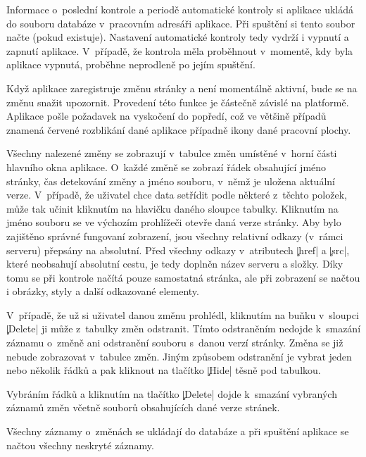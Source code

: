 Informace o~poslední kontrole a periodě automatické kontroly si aplikace ukládá do souboru databáze v~pracovním adresáři aplikace.
Při spuštění si tento soubor načte (pokud existuje).
Nastavení automatické kontroly tedy vydrží i vypnutí a zapnutí aplikace.
V~případě, že kontrola měla proběhnout v~momentě, kdy byla aplikace vypnutá, proběhne neprodleně po jejím spuštění.

Když aplikace zaregistruje změnu stránky a není momentálně aktivní, bude se na změnu snažit upozornit.
Provedení této funkce je částečně závislé na platformě. 
Aplikace pošle požadavek na vyskočení do popředí, což ve většině případů znamená červené rozblikání dané aplikace případně ikony dané pracovní plochy.

Všechny nalezené změny se zobrazují v~tabulce změn umístěné v~horní části hlavního okna aplikace.
O~každé změně se zobrazí řádek obsahující jméno stránky, čas detekování změny a jméno souboru, v~němž je uložena aktuální verze.
V~případě, že uživatel chce data setřídit podle některé z~těchto položek, může tak učinit kliknutím na hlavičku daného sloupce tabulky.
Kliknutím na jméno souboru se ve výchozím prohlížeči otevře daná verze stránky.
Aby bylo zajištěno správné fungovaní zobrazení, jsou všechny relativní odkazy (v~rámci serveru) přepsány na absolutní.
Před všechny odkazy v~atributech \c|href| a \c|src|, které neobsahují absolutní cestu, je tedy doplněn název serveru a složky.
Díky tomu se při kontrole načítá pouze samostatná stránka, ale při zobrazení se načtou i obrázky, styly a další odkazované elementy.

V~případě, že už si uživatel danou změnu prohlédl, kliknutím na buňku v~sloupci \c|Delete| ji může z~tabulky změn odstranit.
Tímto odstraněním nedojde k~smazání záznamu o~změně ani odstranění souboru s~danou verzí stránky.
Změna se již nebude zobrazovat v~tabulce změn.
Jiným způsobem odstranění je vybrat jeden nebo několik řádků a pak kliknout na tlačítko \c|Hide| těsně pod tabulkou.

Vybráním řádků a kliknutím na tlačítko \c|Delete| dojde k~smazání vybraných záznamů změn včetně souborů obsahujících dané verze stránek.

Všechny záznamy o~změnách se ukládají do databáze a při spuštění aplikace se načtou všechny neskryté záznamy. 
